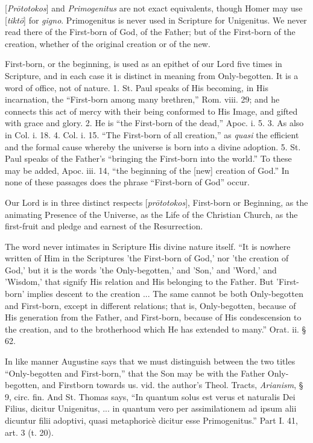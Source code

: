 
[\emph{Pr\={o}totokos}] and \emph{Primogenitus}
are not exact equivalents, though Homer may use [\emph{tikt\={o}}]
for \emph{gigno}. Primogenitus is never used in Scripture for
Unigenitus. We never read there of the First-born of God, of the
Father; but of the First-born of the creation, whether of the original
creation or of the new.

First-born, or the beginning, is used as an
epithet of our Lord five times in Scripture, and in each case it is
distinct in meaning from Only-begotten. It is a word of office, not of
nature. 1. St. Paul speaks of His becoming, in His incarnation, the ``First-born
among many brethren,'' Rom. viii. 29; and he connects this act of mercy
with their being conformed to His Image, and gifted with grace and
glory. 2. He is ``the First-born of the dead,'' Apoc. i. 5. 3. As also
in Col. i. 18. 4. Col. i. 15. ``The First-born of all creation,'' as \emph{quasi}
the efficient and the formal cause whereby the universe is born into a
divine adoption. 5. St. Paul speaks of the Father's ``bringing the
First-born into the world.'' To these may be added, Apoc. iii. 14, ``the
beginning of the [new] creation of God.'' In none of these passages
does the phrase ``First-born of God'' occur.

Our Lord is in three distinct respects [\emph{pr\={o}totokos}],
First-born or Beginning, as the animating Presence of the Universe, as
the Life of the Christian Church, as the first-fruit and pledge and
earnest of the Resurrection.

The word never intimates in Scripture His divine
nature itself. ``It is nowhere written of Him in the Scriptures 'the
First-born of God,' nor 'the creation of God,' but it is the words
'the Only-begotten,' and 'Son,' and 'Word,' and 'Wisdom,' that signify
His relation and His belonging to the Father. But 'First-born' implies
descent to the creation ... The same cannot be both Only-begotten and
First-born, except in different relations; that is, Only-begotten,
because of His generation from the Father, and First-born, because of
His condescension to the creation, and to the brotherhood which He has
extended to many.'' Orat. ii. § 62.

In like manner Augustine says that we must
distinguish between the two titles ``Only-begotten and First-born,''
that the Son may be with the Father Only-begotten, and Firstborn
towards us. vid. the author's Theol. Tracts, \emph{Arianism}, § 9,
circ. fin. And St. Thomas says, ``In quantum solus est verus et
naturalis Dei Filius, dicitur Unigenitus, ... in quantum vero per
assimilationem ad ipsum alii dicuntur filii adoptivi, quasi metaphoricè
dicitur esse Primogenitus.'' Part I. 41, art. 3 (t. 20).

